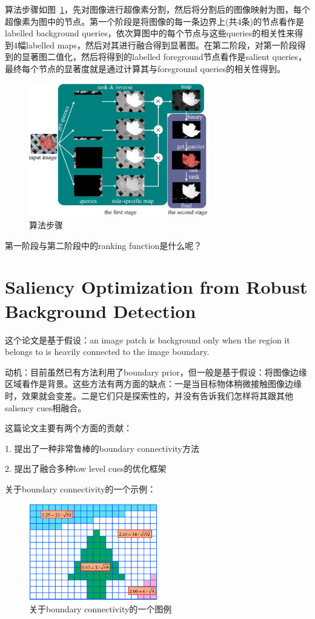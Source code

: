 \documentclass[12pt]{article}
\begin{document}
算法步骤如图~\ref{fig: MR1}，先对图像进行超像素分割，然后将分割后的图像映射为图，每个超像素为图中的节点。第一个阶段是将图像的每一条边界上(共4条)的节点看作是labelled background queries，依次算图中的每个节点与这些queries的相关性来得到4幅labelled maps，然后对其进行融合得到显著图。在第二阶段，对第一阶段得到的显著图二值化，然后将得到的labelled foreground节点看作是salient queries，最终每个节点的显著度就是通过计算其与foreground queries的相关性得到。
\begin{figure}[!ht]
\centering
\includegraphics[width=0.7\textwidth]{MR1.png}
\caption{算法步骤}
\label{fig: MR1}
\end{figure}

第一阶段与第二阶段中的ranking function是什么呢？

\section{Saliency Optimization from Robust Background Detection}

这个论文是基于假设：an image patch is background only when the region it belongs to is heavily connected to the image boundary.

动机：目前虽然已有方法利用了boundary prior，但一般是基于假设：将图像边缘区域看作是背景。这些方法有两方面的缺点：一是当目标物体稍微接触图像边缘时，效果就会变差。二是它们只是探索性的，并没有告诉我们怎样将其跟其他saliency cues相融合。

这篇论文主要有两个方面的贡献：

1. 提出了一种非常鲁棒的boundary connectivity方法

2. 提出了融合多种low level cues的优化框架

关于boundary connectivity的一个示例：
\begin{figure}[!ht]
\centering
\includegraphics[width=0.5\textwidth]{wCtr.png}
\caption{关于boundary connectivity的一个图例}
\label{fig: wCtr}
\end{figure}
\end{document}
